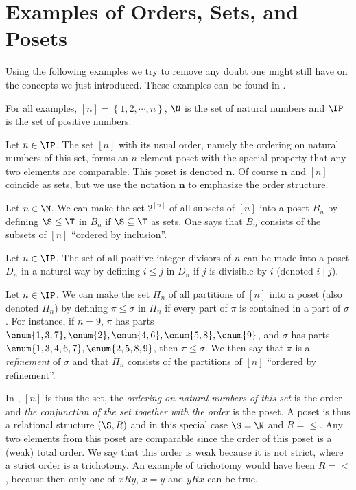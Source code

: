 \section{Examples of Orders, Sets, and Posets}


Using the following examples we try to remove any doubt one might still have on the
concepts we just introduced. These examples can be found in
\citet*{Stanley:2011:ECV:2124415}.

For all examples, $[n] = \left\{{1, 2, \cdots, n}\right\}$, $\N$ is the set
of natural numbers and $\IP$ is the set of positive numbers.

\begin{example}
\label{ex:poset:def}

\item\label{ex:poset:def:a} Let $n \in \IP$. The set $[n]$ with its usual order,
namely the ordering on natural numbers of this set, forms an $n$-element poset
with the special property that any two elements are comparable. This poset is
denoted $\bm{n}$. Of course $\bm{n}$ and $[n]$ coincide as sets, but we use the
notation $\bm{n}$ to emphasize the order structure.

\item\label{ex:poset:def:b} Let $n \in \N$. We can make the set $2^{[n]}$ of
all subsets of $[n]$ into a poset $B_n$ by defining $\S \leq \T$ in $B_n$ if $\S
\subseteq \T$ as sets. One says that $B_n$ consists of the subsets of $[n]$
``ordered by inclusion''.

\item\label{ex:poset:def:c}  Let $n \in \IP$. The set of all positive integer
divisors of $n$ can be made into a poset $D_n$ in a natural way by defining $i
\leq j$ in $D_n$ if $j$ is divisible by $i$ (denoted $i \mid j$).

\item\label{ex:poset:def:d}  Let $n \in \IP$. We can make the set $\Pi_n$ of all
partitions of $[n]$ into a poset (also denoted $\Pi_n$) by defining $\pi \leq
\sigma$ in $\Pi_n$ if every part of $\pi$ is contained in a part of $\sigma$.
For instance, if $n = 9$, $\pi$ has parts $\enum{1,3,7}, \enum{2}, \enum{4,6},
\enum{5,8}, \enum{9}$, and
$\sigma$ has parts $\enum{1,3,4,6,7}, \enum{2,5,8,9}$, then $\pi \leq \sigma$. We then say that
$\pi$ is a \emph{refinement} of $\sigma$ and that $\Pi_n$ consists of the
partitions of $[n]$ ``ordered by refinement''.
\end{example}


In , $[n]$ is thus the set, the \emph{ordering on natural
numbers of this set} is the order and \emph{the conjunction of the set together
with the order} is the poset. A poset is thus a relational structure $(\S, R)$
and in this special case $\S = \N$ and $R = \le$. Any two elements from this
poset are comparable since the order of this poset is a (weak) total order. We
say that this order is weak because it is not strict, where a strict order is a
trichotomy. An example of trichotomy would have been $R = <$, because then only
one of $x R y$, $x = y$ and $y R x$ can be true.


